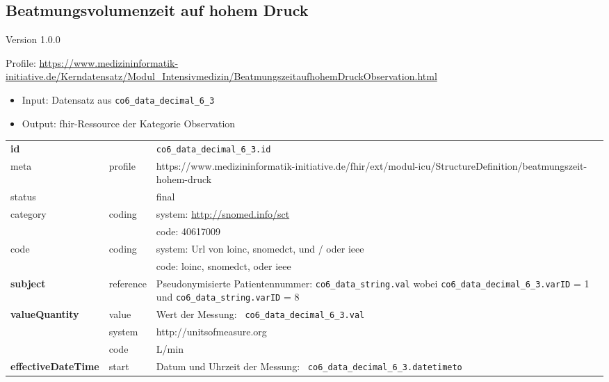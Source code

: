\subsection{Beatmungsvolumenzeit auf hohem Druck} 
\noindent Version 1.0.0

\noindent Profile: \url{https://www.medizininformatik-initiative.de/Kerndatensatz/Modul_Intensivmedizin/BeatmungszeitaufhohemDruckObservation.html}

\begin{itemize}
	\item Input: Datensatz aus \texttt{co6\_data\_decimal\_6\_3}
	\item Output: \ac{fhir}-Ressource der Kategorie \glqq Observation\grqq{}
\end{itemize}

\newpage

\begin{longtable}{|l|l|p{7.5cm}|}
	\hline
	\rowcolor{lightgray} \multicolumn{3}{|l|}{Data Mapping (inhaltlich)} \\ \hline
	\textbf{id} &  & \texttt{co6\_data\_decimal\_6\_3.id} \\ \hline
	meta & profile & https://www.medizininformatik-initiative.de/fhir/ext/modul-icu/StructureDefinition/beatmungszeit-hohem-druck \\ \hline 
	status &  & final   \\ \hline 
	category & coding & system: \url{http://snomed.info/sct} \\
	\cline{3-3}
	& & code: 40617009 \\ \hline
	code & coding & system: Url von \ac{loinc}, \ac{snomedct}, und / oder \ac{ieee} \\ 
	\cline{3-3} 
	&  & code: \ac{loinc}, \ac{snomedct}, oder \ac{ieee} \\ \hline
	\textbf{subject} & reference & Pseudonymisierte Patientennummer: \texttt{co6\_data\_string.val} wobei \texttt{co6\_data\_decimal\_6\_3.varID} = 1 und \texttt{co6\_data\_string.varID} = 8 \\ \hline
	\textbf{valueQuantity}  & value & Wert der Messung: \texttt{
		co6\_data\_decimal\_6\_3.val} \\
	\cline{2-3}
	& system & http://unitsofmeasure.org \\
	\cline{2-3}
	& code &
	L/min
	\\ \hline
	\textbf{effectiveDateTime}  & start & Datum und Uhrzeit der Messung: \texttt{
		co6\_data\_decimal\_6\_3.datetimeto} \\
	\hline
\end{longtable}


